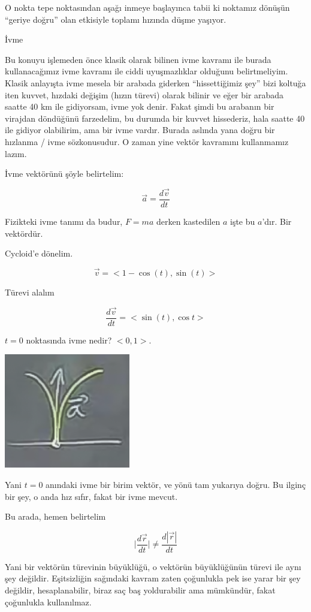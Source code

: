 \documentclass[12pt,fleqn]{article}\usepackage{../../common}
\begin{document}
O nokta tepe noktasından aşağı inmeye başlayınca tabii ki noktamız dönüşün
``geriye doğru'' olan etkisiyle toplamı hızında düşme yaşıyor.

İvme

Bu konuyu işlemeden önce klasik olarak bilinen ivme kavramı ile burada
kullanacağımız ivme kavramı ile ciddi uyuşmazlıklar olduğunu
belirtmeliyim. Klasik anlayışta ivme mesela bir arabada giderken ``hissettiğimiz
şey'' bizi koltuğa iten kuvvet, hızdaki değişim (hızın türevi) olarak bilinir ve
eğer bir arabada saatte 40 km ile gidiyorsam, ivme yok denir. Fakat şimdi bu
arabanın bir virajdan döndüğünü farzedelim, bu durumda bir kuvvet hissederiz,
hala saatte 40 ile gidiyor olabilirim, ama bir ivme vardır. Burada aslında yana
doğru bir hızlanma / ivme sözkonusudur. O zaman yine vektör kavramını
kullanmamız lazım.

İvme vektörünü şöyle belirtelim:

$$ \vec{a} = \frac{d\vec{v}}{dt} $$

Fizikteki ivme tanımı da budur, $F = ma$ derken kastedilen $a$ işte bu
$a$'dır. Bir vektördür. 

Cycloid'e dönelim. 

$$ \vec{v} = <1-\cos(t),\sin(t)>$$

Türevi alalım

$$ \frac{d\vec{v}}{dt} = <\sin(t), \cos t>$$

$t=0$ noktasında ivme nedir? $<0,1>$. 

\begin{center}
\includegraphics[height=5cm]{6_2.png}
\end{center}

Yani $t=0$ anındaki ivme bir birim vektör, ve yönü tam yukarıya doğru. Bu ilginç
bir şey, o anda hız sıfır, fakat bir ivme mevcut.

Bu arada, hemen belirtelim

$$ \bigg|\frac{d\vec{r}}{dt}\bigg|  \ne \frac{d|\vec{r}|}{dt}$$

Yani bir vektörün türevinin büyüklüğü, o vektörün büyüklüğünün türevi ile aynı
şey değildir. Eşitsizliğin sağındaki kavram zaten çoğunlukla pek ise yarar bir
şey değildir, hesaplanabilir, biraz saç baş yoldurabilir ama mümkündür, fakat
çoğunlukla kullanılmaz.
\end{document}
